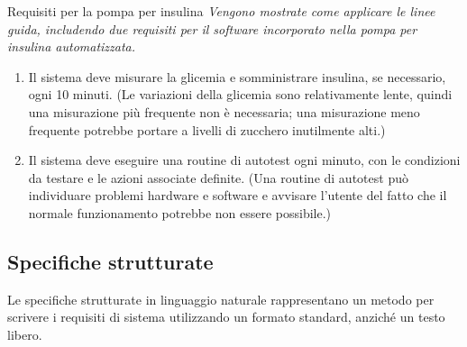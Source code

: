 \begin{Example}{Requisiti per la pompa per insulina}{}
\textit{Vengono mostrate come applicare le linee guida, includendo due requisiti per il software incorporato nella pompa per insulina automatizzata.}    
\begin{enumerate}
    \item Il sistema deve misurare la glicemia e somministrare insulina, se necessario, ogni 10 minuti. (Le variazioni della glicemia sono relativamente lente, quindi una misurazione più frequente non è necessaria; una misurazione meno frequente potrebbe portare a livelli di zucchero inutilmente alti.)
    \item Il sistema deve eseguire una routine di autotest ogni minuto, con le condizioni da testare e le azioni associate definite. (Una routine di autotest può individuare problemi hardware e software e avvisare l’utente del fatto che il normale funzionamento potrebbe non essere possibile.)
\end{enumerate}
\end{Example}

\subsection{Specifiche strutturate}
Le specifiche strutturate in linguaggio naturale rappresentano un metodo per scrivere i requisiti di sistema utilizzando un formato standard, anziché un testo libero.


